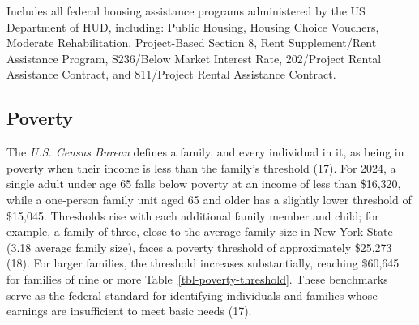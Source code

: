 \documentclass[
  english,
  letterpaper,
]{report}
\begin{document}
\begin{tcolorbox}[enhanced jigsaw, breakable, leftrule=.75mm, title=\textcolor{quarto-callout-note-color}{\faInfo}\hspace{0.5em}{Note}, bottomrule=.15mm, opacityback=0, left=2mm, colback=white, bottomtitle=1mm, coltitle=black, colbacktitle=quarto-callout-note-color!10!white, colframe=quarto-callout-note-color-frame, opacitybacktitle=0.6, toptitle=1mm, titlerule=0mm, arc=.35mm, rightrule=.15mm, toprule=.15mm]

Includes all federal housing assistance programs administered by the US
Department of HUD, including: Public Housing, Housing Choice Vouchers,
Moderate Rehabilitation, Project-Based Section 8, Rent Supplement/Rent
Assistance Program, S236/Below Market Interest Rate, 202/Project Rental
Assistance Contract, and 811/Project Rental Assistance Contract.

\end{tcolorbox}

\subsection{Poverty}\label{poverty}

The \emph{U.S. Census Bureau} defines a family, and every individual in
it, as being in poverty when their income is less than the family's
threshold (17). For 2024, a single adult under age 65 falls below
poverty at an income of less than \$16,320, while a one-person family
unit aged 65 and older has a slightly lower threshold of \$15,045.
Thresholds rise with each additional family member and child; for
example, a family of three, close to the average family size in New York
State (3.18 average family size), faces a poverty threshold of
approximately \$25,273 (18). For larger families, the threshold
increases substantially, reaching \$60,645 for families of nine or more
Table~\ref{tbl-poverty-threshold}. These benchmarks serve as the federal
standard for identifying individuals and families whose earnings are
insufficient to meet basic needs (17).
\end{document}
